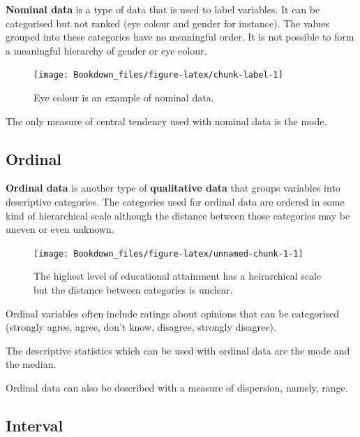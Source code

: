 \documentclass[
]{book}
\begin{document}
\textbf{Nominal data} is a type of data that is used to label variables. It can be categorised but not ranked (eye colour and gender for instance). The values grouped into these categories have no meaningful order. It is not possible to form a meaningful hierarchy of gender or eye colour.

\begin{figure}

{\centering \texttt{[image: Bookdown\_files/figure-latex/chunk-label-1]} 

}

\caption{Eye colour is an example of nominal data.}\label{fig:chunk-label}
\end{figure}

The only measure of central tendency used with nominal data is the mode.

\hypertarget{ordinal}{%
\subsection{Ordinal}\label{ordinal}}

\textbf{Ordinal data} is another type of \textbf{qualitative data} that groups variables into descriptive categories. The categories used for ordinal data are ordered in some kind of hierarchical scale although the distance between those categories may be uneven or even unknown.

\begin{figure}

{\centering \texttt{[image: Bookdown\_files/figure-latex/unnamed-chunk-1-1]} 

}

\caption{The highest level of educational attainment has a heirarchical scale but the distance between categories is unclear.}\label{fig:unnamed-chunk-1}
\end{figure}

Ordinal variables often include ratings about opinions that can be categorised (strongly agree, agree, don't know, disagree, strongly disagree).

The descriptive statistics which can be used with ordinal data are the mode and the median.

Ordinal data can also be described with a measure of dispersion, namely, range.

\hypertarget{interval}{%
\subsection{Interval}\label{interval}}
\end{document}
